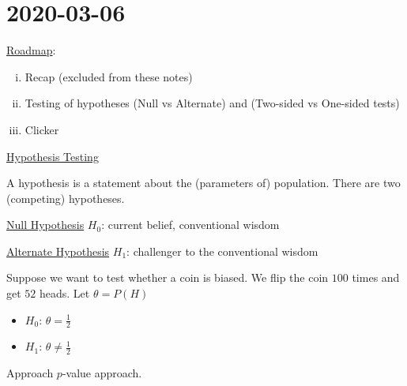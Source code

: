 \section{2020-03-06}
\underline{Roadmap}:
\begin{enumerate}[(i)]
    \item Recap (excluded from these notes)
    \item Testing of hypotheses (Null vs Alternate) and (Two-sided vs One-sided tests)
    \item Clicker
\end{enumerate}
\underline{Hypothesis Testing}
\begin{defbox}
    \begin{definition}
        A hypothesis is a statement about the (parameters of) population. There
        are two (competing) hypotheses.

        \underline{Null Hypothesis} $ H_0 $: current belief, conventional wisdom

        \underline{Alternate Hypothesis} $ H_1 $: challenger to the conventional wisdom
    \end{definition}
\end{defbox}

\begin{exbox}
    \begin{example}
        Suppose we want to test whether a coin is biased. We flip the coin $ 100 $
        times and get $ 52 $ heads. Let $ \theta=P(H) $
        \begin{itemize}
            \item $ H_0 $: $ \theta=\frac{1}{2} $
            \item $ H_1 $: $ \theta\neq \frac{1}{2} $
        \end{itemize}
        Approach $ p $-value approach.
    \end{example}
\end{exbox}

